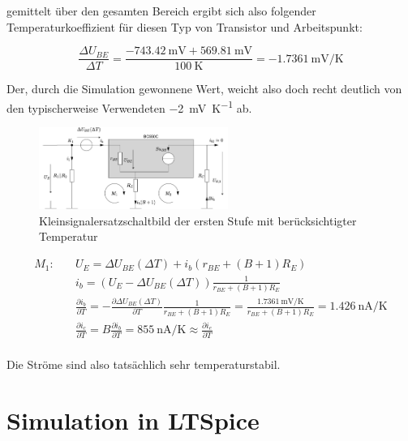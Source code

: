 gemittelt über den gesamten Bereich ergibt sich also folgender Temperaturkoeffizient für diesen Typ von Transistor und Arbeitspunkt:

\begin{equation*}
    \frac{\Delta U_{BE}}{\Delta T} = \frac{-\SI{743.42}{\milli \volt} + \SI{569.81}{\milli \volt}}{\SI{100}{\kelvin}} = \SI{-1.7361}{\milli \volt \per \kelvin}
\end{equation*}

Der, durch die Simulation gewonnene Wert, weicht also doch recht deutlich von den typischerweise Verwendeten \SI{-2}{\milli \volt \per \kelvin} ab.

\begin{figure}[H]
    \centering
    \includegraphics[width = 0.55\textwidth]{tex/1_Microphone/pictures/KSESB_temp.pdf}
    \caption{Kleinsignalersatzschaltbild der ersten Stufe mit berücksichtigter Temperatur}
    \label{fig:my_label}
\end{figure}

\begin{align*}
    M_1:& \quad U_E = \Delta U_{BE}(\Delta T) + i_b \left( r_{BE} + (B+1) R_E \right) \\
    & \quad i_b = (U_E - \Delta U_{BE}(\Delta T)) \frac{1}{r_{BE} + (B+1) R_E} \\
     & \quad \frac{\partial i_b}{\partial T} = -\frac{\partial \Delta U_{BE}(\Delta T)}{\partial T} \frac{1}{r_{BE} + (B+1) R_E}
     = \frac{\SI{1.7361}{\milli \volt \per \kelvin}}{r_{BE} + (B+1) R_E} = \SI{1.426}{\nano \ampere \per \kelvin}\\
    &  \quad \frac{\partial i_c}{\partial T} = B \frac{\partial i_b}{\partial T} = \SI{855}{\nano \ampere \per \kelvin} \approx \frac{\partial i_e}{\partial T}\\
\end{align*}

Die Ströme sind also tatsächlich sehr temperaturstabil.

\section{Simulation in LTSpice}

